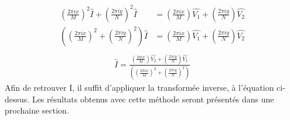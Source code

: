 \begin{equation}
\begin{aligned}
\left(\frac{2\pi i x}{M}\right)^2 \widehat{I}+\left(\frac{2\pi i y}{N}\right)^2 \widehat{I} & = \left(\frac{2\pi i x}{M}\right) \widehat{V_1}+\left(\frac{2\pi i y}{N}\right) \widehat{V_2}\\
\left(\left(\frac{2\pi i x}{M}\right)^2+\left(\frac{2\pi i y}{N}\right)^2\right) \widehat{I} & = \left(\frac{2\pi i x}{M}\right) \widehat{ V_1}+\left(\frac{2\pi i y}{N}\right) \widehat{V_2}\\
\end{aligned}
\end{equation}
\begin{equation}
\begin{aligned}
\widehat{I} = \frac{\left(\frac{2\pi i x}{M}\right) \widehat{ V_2}+\left(\frac{2\pi i y}{N}\right) \widehat{V_1}}{\left(\left(\frac{2\pi i x}{M}\right)^2+\left(\frac{2\pi i y}{N}\right)^2\right)}
\end{aligned}
\end{equation}
Afin de retrouver I, il suffit d'appliquer la transformée inverse, à l'équation ci-dessus.
Les résultats obtenus avec cette méthode seront présentés dans une prochaine section. 